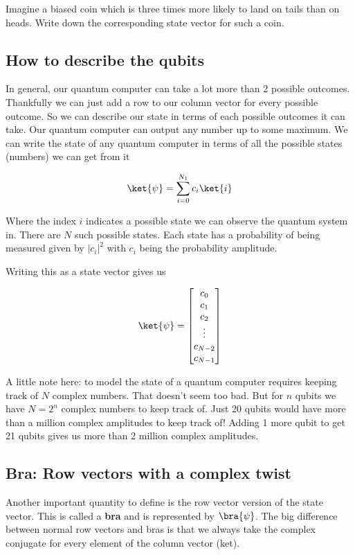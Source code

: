 \documentclass{book}
\begin{document}
Imagine a biased coin which is three times more likely to land on tails than on heads. Write down the corresponding state vector for such a coin.


\subsection{How to describe the qubits}

In general, our quantum computer can take a lot more than 2 possible outcomes. Thankfully we can just add a row to our column vector for every possible outcome. So we can describe our state in terms of each possible outcomes it can take. Our quantum computer can output any number up to some maximum.  We can write the state of any quantum computer in terms of all the possible states (numbers) we can get from it

$$
\ket{\psi} = \sum_{i = 0}^{N_1} c_i \ket{i}
$$


Where the index $i$ indicates a possible state we can observe the quantum system in. There are $N$ such possible states. Each state has a probability of being measured given by $|c_i|^2$  with $c_i$ being the probability amplitude. 

Writing this as a state vector gives us 

$$
\ket{\psi} = \begin{bmatrix} c_0 \\ c_1 \\ c_2 \\ \vdots \\ c_{N-2} \\ c_{N-1} \end{bmatrix}
$$

A little note here: to model the state of a quantum computer requires keeping track of $N$ complex numbers. That doesn't seem too bad.  But for $n$ qubits we have $N = 2^n$ complex numbers to keep track of. Just 20 qubits would have more than a million complex amplitudes to keep track of! Adding 1 more qubit to get 21 qubits gives us more than 2 million complex amplitudes. 


\subsection{ Bra: Row vectors with a complex twist }


Another important quantity to define is the row vector version of the state vector. This is called a \textbf{bra} and is represented by $\bra{\psi}$. The big difference between normal row vectors and bras is that we always take the complex conjugate for every element of the column vector (ket). 
\end{document}
